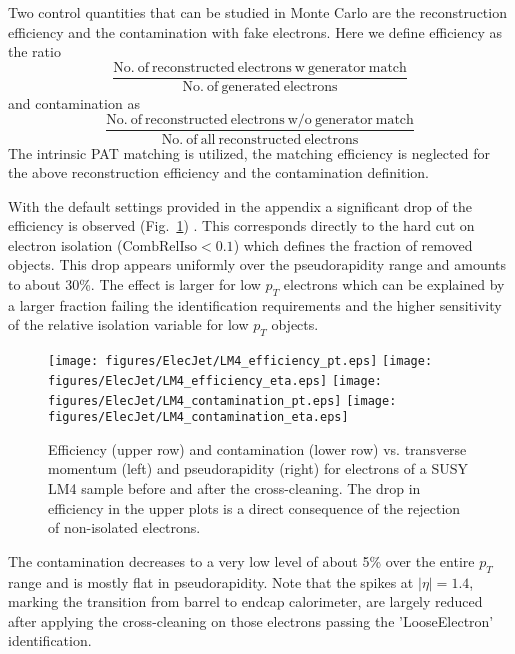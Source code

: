 \documentclass{cmspaper}
\begin{document}
Two control quantities that can be
studied in Monte Carlo are the reconstruction efficiency and the contamination
with fake electrons. Here we define efficiency as the ratio 
\[\frac{\mathrm{No.\ of\ reconstructed\ electrons\ w\ generator\ match}}{\mathrm{No.\ of\ generated\ electrons}}\]
and contamination as
\[\frac{\mathrm{No.\ of\ reconstructed\ electrons\ w/o\ generator\ match
}}{\mathrm{No.\ of\ all\ reconstructed\ electrons}}\]
The intrinsic PAT matching is utilized, the matching efficiency is neglected for
the above reconstruction efficiency and the contamination definition.

With the default settings provided in the appendix a significant drop of the
efficiency is observed (Fig.~\ref{fig:effCont_elec_ElecJet}) . This
corresponds directly to the hard cut on electron isolation
($\mathrm{CombRelIso}<0.1$) which defines the fraction of removed objects. This
drop appears uniformly over the pseudorapidity range and amounts to
about 30\%.  The effect is larger for low $p_T$ electrons which can be
explained by a larger fraction failing the identification requirements and the
higher sensitivity of the relative isolation variable for low $p_T$ objects.

\begin{figure}[hb]
\begin{center}
    \texttt{[image: figures/ElecJet/LM4\_efficiency\_pt.eps]}
    \texttt{[image: figures/ElecJet/LM4\_efficiency\_eta.eps]}
    \texttt{[image: figures/ElecJet/LM4\_contamination\_pt.eps]}
    \texttt{[image: figures/ElecJet/LM4\_contamination\_eta.eps]}
    \caption{Efficiency (upper row) and contamination (lower row) vs. transverse
    momentum (left) and pseudorapidity (right) for electrons of a SUSY LM4
    sample before and after
    the cross-cleaning. The drop in efficiency in the upper plots is a direct
    consequence of the rejection of non-isolated electrons.} \label{fig:effCont_elec_ElecJet}
\end{center}
\end{figure}

The contamination decreases to a very low level of about 5\% over the entire $p_T$
range and is mostly flat in pseudorapidity. Note that the spikes at
$|\eta|=1.4$, marking the transition from barrel to endcap calorimeter, are
largely reduced after applying the cross-cleaning on those electrons passing the
'LooseElectron' identification.
\end{document}
